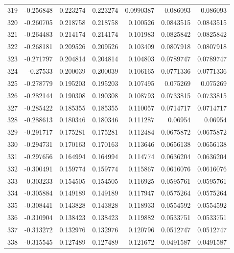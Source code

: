 \begin{tabular}{rrrrrrr}
 319 & -0.256848    & 0.223274    & 0.223274    &  0.0990387   & 0.086093    & 0.086093    \\
 320 & -0.260705    & 0.218758    & 0.218758    &  0.100526    & 0.0843515   & 0.0843515   \\
 321 & -0.264483    & 0.214174    & 0.214174    &  0.101983    & 0.0825842   & 0.0825842   \\
 322 & -0.268181    & 0.209526    & 0.209526    &  0.103409    & 0.0807918   & 0.0807918   \\
 323 & -0.271797    & 0.204814    & 0.204814    &  0.104803    & 0.0789747   & 0.0789747   \\
 324 & -0.27533     & 0.200039    & 0.200039    &  0.106165    & 0.0771336   & 0.0771336   \\
 325 & -0.278779    & 0.195203    & 0.195203    &  0.107495    & 0.075269    & 0.075269    \\
 326 & -0.282144    & 0.190308    & 0.190308    &  0.108793    & 0.0733815   & 0.0733815   \\
 327 & -0.285422    & 0.185355    & 0.185355    &  0.110057    & 0.0714717   & 0.0714717   \\
 328 & -0.288613    & 0.180346    & 0.180346    &  0.111287    & 0.06954     & 0.06954     \\
 329 & -0.291717    & 0.175281    & 0.175281    &  0.112484    & 0.0675872   & 0.0675872   \\
 330 & -0.294731    & 0.170163    & 0.170163    &  0.113646    & 0.0656138   & 0.0656138   \\
 331 & -0.297656    & 0.164994    & 0.164994    &  0.114774    & 0.0636204   & 0.0636204   \\
 332 & -0.300491    & 0.159774    & 0.159774    &  0.115867    & 0.0616076   & 0.0616076   \\
 333 & -0.303233    & 0.154505    & 0.154505    &  0.116925    & 0.0595761   & 0.0595761   \\
 334 & -0.305884    & 0.149189    & 0.149189    &  0.117947    & 0.0575264   & 0.0575264   \\
 335 & -0.308441    & 0.143828    & 0.143828    &  0.118933    & 0.0554592   & 0.0554592   \\
 336 & -0.310904    & 0.138423    & 0.138423    &  0.119882    & 0.0533751   & 0.0533751   \\
 337 & -0.313272    & 0.132976    & 0.132976    &  0.120796    & 0.0512747   & 0.0512747   \\
 338 & -0.315545    & 0.127489    & 0.127489    &  0.121672    & 0.0491587   & 0.0491587   \\

\end{tabular}
